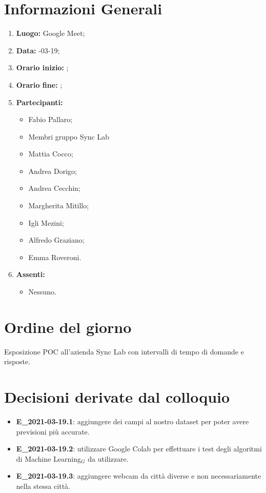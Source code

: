 \newpage
\section{Informazioni Generali}
\begin{enumerate}
	\item \textbf{Luogo:} \normalfont Google Meet;
	\item \textbf{Data:} -03-19;
	\item \textbf{Orario inizio:} ;
	\item \textbf{Orario fine:} ;
	\item \textbf{Partecipanti:}
	\begin{itemize}
		\item Fabio Pallaro;
		\item Membri gruppo Sync Lab
		\item Mattia Cocco;
		\item Andrea Dorigo;
		\item Andrea Cecchin;
		\item Margherita Mitillo;
		\item Igli Mezini;
		\item Alfredo Graziano;
		\item Emma Roveroni.
	\end{itemize}
	\item \textbf{Assenti:}
	\begin{itemize}
		\item Nessuno.
	\end{itemize}
\end{enumerate}
\section{Ordine del giorno}
Esposizione POC all'azienda Sync Lab con intervalli di tempo di domande e risposte.

\section{Decisioni derivate dal colloquio}
\begin{itemize}
	\item \textbf{E\_2021-03-19.1}: aggiungere dei campi al nostro dataset per poter avere previsioni più accurate.
\end{itemize}
\begin{itemize}
	\item \textbf{E\_2021-03-19.2}: utilizzare Google Colab per effettuare i test degli algoritmi di Machine Learning$_G$ da utilizzare.
\end{itemize}
\begin{itemize}
	\item \textbf{E\_2021-03-19.3}: aggiungere webcam da città diverse e non necessariamente nella stessa città.
\end{itemize}